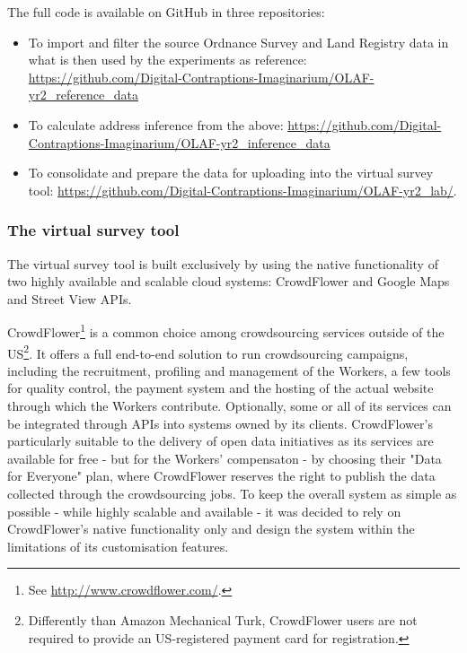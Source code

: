         The full code is available on GitHub in three repositories:
        
        \begin{itemize}
            \item To import and filter the source Ordnance Survey and Land Registry data in what is then used by the experiments as reference: \url{https://github.com/Digital-Contraptions-Imaginarium/OLAF-yr2_reference_data}
            \item To calculate address inference from the above: \url{https://github.com/Digital-Contraptions-Imaginarium/OLAF-yr2_inference_data}
            \item To consolidate and prepare the data for uploading into the virtual survey tool: \url{https://github.com/Digital-Contraptions-Imaginarium/OLAF-yr2_lab/}.
        \end{itemize}

    \subsubsection{The virtual survey tool}
    
        The virtual survey tool is built exclusively by using the native functionality of two highly available and scalable cloud systems: CrowdFlower and Google Maps and Street View APIs. 
        
        CrowdFlower\footnote{See \url{http://www.crowdflower.com/}.} is a common choice among crowdsourcing services outside of the US\footnote{Differently than Amazon Mechanical Turk, CrowdFlower users are not required to provide an US-registered payment card for registration.}. It offers a full end-to-end solution to run crowdsourcing campaigns, including the recruitment, profiling and management of the Workers, a few tools for quality control, the payment system and the hosting of the actual website through which the Workers contribute. Optionally, some or all of its services can be integrated through APIs into systems owned by its clients. CrowdFlower's particularly suitable to the delivery of open data initiatives as its services are available for free - but for the Workers' compensaton - by choosing their "Data for Everyone" plan, where CrowdFlower reserves the right to publish the data collected through the crowdsourcing jobs. To keep the overall system as simple as possible - while highly scalable and available - it was decided to rely on CrowdFlower's native functionality only and design the system within the limitations of its customisation features.

